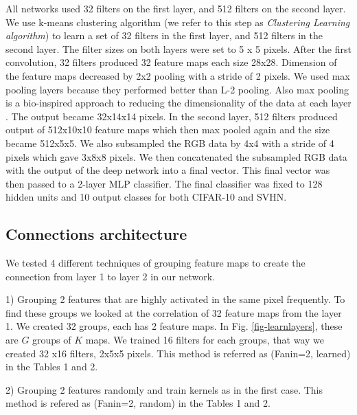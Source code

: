 \documentclass{article} %
\begin{document}
All networks used 32 filters on the first layer, and 512 filters on the second layer. We use k-means clustering algorithm (we refer to this step as \textit{Clustering Learning algorithm}) to learn a set of 32 filters in the first layer, and 512 filters in the second layer. The filter sizes on both layers were set to 5 x 5 pixels.  After the first convolution, 32 filters produced 32 feature maps each size 28x28. Dimension of the feature maps decreased by 2x2 pooling with a stride of 2 pixels. We used max pooling layers because they performed better than L-2 pooling. Also max pooling is a bio-inspired approach to reducing the dimensionality of the data at each layer \cite{lampl2004intracellular}. The output became 32x14x14 pixels. In the second layer, 512 filters produced output of 512x10x10 feature maps which then max pooled again and the size became 512x5x5. 
We also subsampled the RGB data by 4x4 with a stride of 4 pixels which gave 3x8x8 pixels.  We then concatenated the subsampled RGB data with the output of the deep network into a final vector. This final vector was then passed to a 2-layer MLP classifier. The final classifier was fixed to 128 hidden units and 10 output classes for both CIFAR-10 and SVHN.





\subsection{Connections architecture}
We tested 4 different techniques of grouping feature maps to create the connection from layer 1 to layer 2 in our network.

1) Grouping 2 features that are highly activated in the same pixel frequently. To find these groups we looked at the correlation of 32 feature maps from the layer 1. We created 32 groups, each has 2 feature maps. In Fig. \ref{fig-learnlayers}, these are $G$ groups of $K$ maps. We trained 16 filters for each groups, that way we created 32 x16 filters, 2x5x5 pixels. This method is  referred as  (Fanin=2, learned) in the Tables 1 and 2. 

2)  Grouping 2 features  randomly and train kernels as in the first case.  This method is  refered as  (Fanin=2, random) in the Tables 1 and 2.
\end{document}
